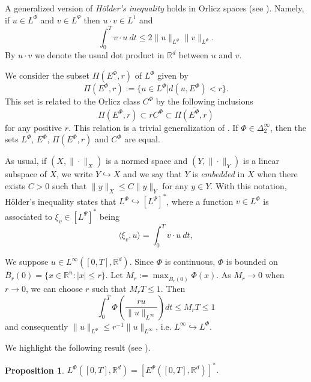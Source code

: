 \documentclass[twoside]{article}
\newtheorem{prop}[thm]{Proposition}
\theoremstyle{remark}
\newcommand{\orlnor}{\|_{L^{\Phi}}}
\newcommand{\linf}{\|_{L^{\infty}}}
\newcommand{\lphi}{L^{\Phi}}
\newcommand{\lpsi}{L^{\Psi}}
\newcommand{\ephi}{E^{\Phi}}
\newcommand{\claseor}{C^{\Phi}}
\newcommand{\rr}{\mathbb{R}}
\renewcommand{\leq}{\leqslant}
\newcommand{\epsi}{E^{\Psi}}
\begin{document}
A generalized version of \emph{H\"older's inequality} holds in Orlicz spaces (see \cite[Thm. 7.2]{Orliczvectorial2005}). Namely, if $u\in\lphi$ and $v\in\lpsi$ then $u\cdot v\in L^1$ and
\begin{equation}\label{holder}
\int_0^Tv\cdot u\ dt\leq 2 \|u\orlnor\|v\|_{L^{\Psi}}.
\end{equation}
By $u\cdot v$ we denote the usual dot product in $\mathbb{R}^{d}$ between $u$ and $v$.

We consider the subset $\Pi(\ephi,r)$ of $\lphi$ given by
\[\Pi(\ephi,r):=\{u\in\lphi| d(u,\ephi)<r\}.\]
This set is related to the Orlicz class $\claseor$ by the following inclusions
\begin{equation}\label{eq:inclusiones}\Pi(\ephi, r )\subset r \claseor\subset\overline{\Pi(\ephi,r)}
\end{equation}
for any positive $r$. This relation is a trivial generalization of  \cite[Thm. 5.6]{Orliczvectorial2005}.
If $\Phi \in \Delta_2^{\infty}$,  then the sets $\lphi$, $\ephi$, $\Pi(\ephi,r)$ and $\claseor$ are equal.
 
As usual, if $(X,\|\cdot\|_X)$ is a normed space and $(Y,\|\cdot \|_Y)$ is a linear subspace of $X$,  we write $Y\hookrightarrow X$ and we say that $Y$ is \emph{embedded} in $X$  when there exists $C>0$ such that
$\|y\|_X\leq C\|y\|_Y$ for any $y\in Y$.  With this notation, H\"older's inequality states that  $\lphi\hookrightarrow  \left[\lpsi\right]^*$, where a function $v\in\lphi$ is associated  to $\xi_v\in \left[\lpsi\right]^*$ being
\begin{equation}\label{pairing}
  \langle \xi_v,u\rangle=\int_0^Tv\cdot u\ dt,
\end{equation}


We suppose $u\in L^{\infty}([0,T],\rr^d)$. Since $\Phi$ is continuous, $\Phi$ is bounded on $\overline{B}_r(0)=\{x\in \rr^n:|x|\leq r\}$. Let $M_r:=\max_{\overline{B}_r(0)} \Phi(x)$. As $M_r\to 0$ when $r\to 0$, we can choose $r$ such that $M_rT\leq 1$. Then
\[\int_0^T \Phi\left(\frac{ru}{\|u\linf}\right)dt\leq M_rT\leq 1\]
and consequently
$\|u\orlnor \leq r^{-1}\|u\linf$, i.e. $L^{\infty} \hookrightarrow L^\Phi$.


We highlight the following result (see \cite[Th. 3.3]{gwiazda2013anisotropic}).

\begin{prop} $\lphi\left([0,T],\rr^d\right)=\left[\epsi\left([0,T],\rr^d\right)\right]^*$.
 
\end{prop}
\end{document}
